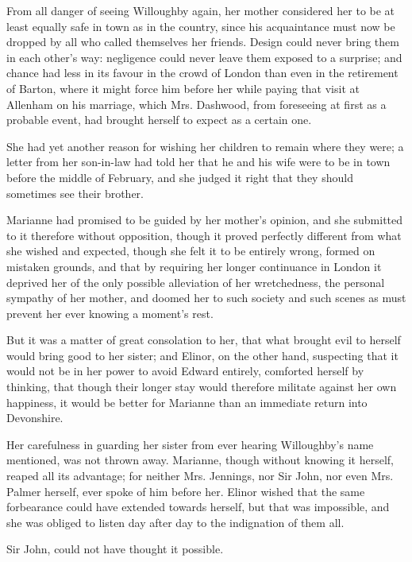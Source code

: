 From all danger of seeing Willoughby again, her mother considered her to be at least equally safe in town as in the country, since his acquaintance must now be dropped by all who called themselves her friends. Design could never bring them in each other's way: negligence could never leave them exposed to a surprise; and chance had less in its favour in the crowd of London than even in the retirement of Barton, where it might force him before her while paying that visit at Allenham on his marriage, which Mrs. Dashwood, from foreseeing at first as a probable event, had brought herself to expect as a certain one.

She had yet another reason for wishing her children to remain where they were; a letter from her son-in-law had told her that he and his wife were to be in town before the middle of February, and she judged it right that they should sometimes see their brother.

Marianne had promised to be guided by her mother's opinion, and she submitted to it therefore without opposition, though it proved perfectly different from what she wished and expected, though she felt it to be entirely wrong, formed on mistaken grounds, and that by requiring her longer continuance in London it deprived her of the only possible alleviation of her wretchedness, the personal sympathy of her mother, and doomed her to such society and such scenes as must prevent her ever knowing a moment's rest.

But it was a matter of great consolation to her, that what brought evil to herself would bring good to her sister; and Elinor, on the other hand, suspecting that it would not be in her power to avoid Edward entirely, comforted herself by thinking, that though their longer stay would therefore militate against her own happiness, it would be better for Marianne than an immediate return into Devonshire.

Her carefulness in guarding her sister from ever hearing Willoughby's name mentioned, was not thrown away. Marianne, though without knowing it herself, reaped all its advantage; for neither Mrs. Jennings, nor Sir John, nor even Mrs. Palmer herself, ever spoke of him before her. Elinor wished that the same forbearance could have extended towards herself, but that was impossible, and she was obliged to listen day after day to the indignation of them all.

Sir John, could not have thought it possible. 

